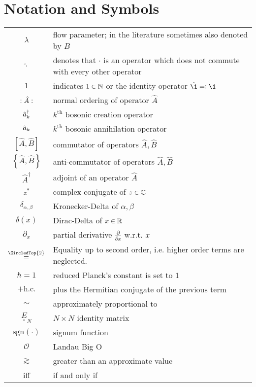 \chapter*{Notation and Symbols}
\begin{tabular}{cp{}}
  $\lambda$ & flow parameter; in the literature sometimes also denoted by $B$ \\
  $\hat\cdot$ & denotes that $\cdot$ is an operator which does not commute with every other operator\\
  $1$ & indicates $1\in\mathbb{N}$ or the identity operator $\hat{\1}\eqdef \1$\\
  $\vcentcolon \hat A\vcentcolon$ & normal ordering of operator $\hat A$\\ 
  $\hat a^\dagger_k$ & $k^\mathrm{th}$ bosonic creation operator \\
  $\hat a_k$ & $k^\mathrm{th}$ bosonic annihilation operator \\
  $[\hat{ A},\hat{ B}]$ & commutator of operators $\hat{ A},\hat{ B}$ \\
  $\left\{\hat{ A},\hat{ B}\right\}$ & anti-commutator of operators $\hat{ A},\hat{ B}$ \\
  $\hat A^\dagger$ & adjoint of an operator $\hat{ A}$ \\
  $z^*$ & complex conjugate of $z\in\mathbb{C}$ \\
  $\delta_{\alpha,\beta}$ & Kronecker-Delta of $\alpha,\beta$ \\ 
  $\delta (x)$ & Dirac-Delta of $x\in\mathbb{R}$\\
  $\partial_x$ & partial derivative $\frac{\partial}{\partial x}$ w.r.t. $x$\\
  $\overset{\CircledTop{2}}{=}$ & Equality up to second order, i.e. higher order terms are neglected.\\
  $\hbar=1$ & reduced Planck's constant is set to $1$\\
  $+\mathrm{h.c.}$ & plus the Hermitian conjugate of the previous term\\
  $\sim$ & approximately proportional to\\
  $\underline{\underline E}_N$ & $N\times N$ identity matrix\\
  $\mathrm{sgn}\left(\cdot\right)$ & signum function\\
  $\mathcal O$ & Landau Big O\\
  $\gtrsim$ & greater than an approximate value\\
  iff & if and only if
\end{tabular}\\







